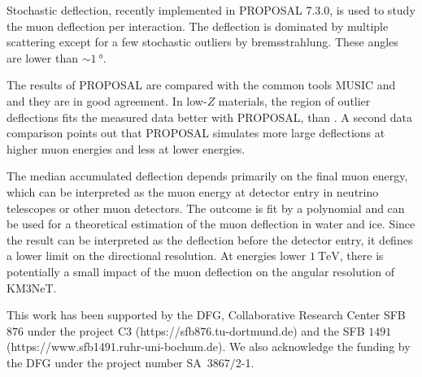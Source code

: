 Stochastic deflection, recently implemented in PROPOSAL 7.3.0, is 
used to study the muon deflection per interaction. The deflection 
is dominated by multiple scattering except for a few stochastic 
outliers by bremsstrahlung. These angles are lower than
$\sim\SI{1}{\degree}$. 

The results of PROPOSAL are compared with the common tools MUSIC and 
 and they are in good agreement. In low-$Z$ materials, the region of outlier 
deflections fits the measured data better with PROPOSAL, than . 
A second data comparison points out that PROPOSAL simulates more 
large deflections at higher muon energies and less at lower 
energies. 

The median accumulated deflection depends primarily on the final muon energy, which can be interpreted as the muon energy at detector entry 
in neutrino telescopes or other muon detectors.
The outcome is fit by a polynomial and can be used for 
a theoretical estimation of the muon deflection in water and ice.
Since the result can be interpreted as the deflection before the detector entry, it defines a lower limit on the directional resolution.
At energies lower $\SI{1}{\tera\electronvolt}$, there is potentially a small impact of the muon deflection on the angular 
resolution of KM3NeT.


\begin{acknowledgement}
  This work has been supported by the DFG, Collaborative Research Center SFB $876$
  under the project C3 
  (https://sfb876.tu-dortmund.de) and the SFB $1491$ (https://www.sfb1491.ruhr-uni-bochum.de).
  We also acknowledge the funding by the DFG under the project number SA~$3867/$2-1.
\end{acknowledgement}


\printbibliography




